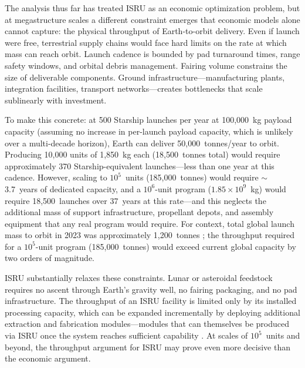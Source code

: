 \documentclass[preprint,12pt]{elsarticle}
\begin{document}
The analysis thus far has treated ISRU as an economic optimization problem, but at megastructure scales a different constraint emerges that economic models alone cannot capture: the physical throughput of Earth-to-orbit delivery. Even if launch were free, terrestrial supply chains would face hard limits on the rate at which mass can reach orbit. Launch cadence is bounded by pad turnaround times, range safety windows, and orbital debris management. Fairing volume constrains the size of deliverable components. Ground infrastructure---manufacturing plants, integration facilities, transport networks---creates bottlenecks that scale sublinearly with investment.

To make this concrete: at 500 Starship launches per year at 100{,}000~kg payload capacity (assuming no increase in per-launch payload capacity, which is unlikely over a multi-decade horizon), Earth can deliver 50{,}000~tonnes/year to orbit. Producing 10{,}000 units of 1{,}850~kg each (18{,}500~tonnes total) would require approximately 370 Starship-equivalent launches---less than one year at this cadence. However, scaling to $10^5$~units (185{,}000~tonnes) would require $\sim$3.7~years of dedicated capacity, and a $10^6$-unit program ($1.85 \times 10^9$~kg) would require 18{,}500~launches over 37~years at this rate---and this neglects the additional mass of support infrastructure, propellant depots, and assembly equipment that any real program would require. For context, total global launch mass to orbit in 2023 was approximately 1{,}200~tonnes \cite{jones2022}; the throughput required for a $10^5$-unit program (185{,}000~tonnes) would exceed current global capacity by two orders of magnitude.

ISRU substantially relaxes these constraints. Lunar or asteroidal feedstock requires no ascent through Earth's gravity well, no fairing packaging, and no pad infrastructure. The throughput of an ISRU facility is limited only by its installed processing capacity, which can be expanded incrementally by deploying additional extraction and fabrication modules---modules that can themselves be produced via ISRU once the system reaches sufficient capability \cite{metzger2013}. At scales of $10^5$~units and beyond, the throughput argument for ISRU may prove even more decisive than the economic argument.
\end{document}
